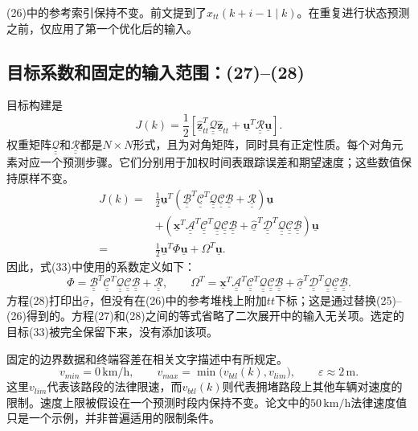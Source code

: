 \documentclass{article}
\newcommand{\uv}{\underline{\mathbf{u}}}
\newcommand{\xv}{\underline{\mathbf{x}}}
\newcommand{\zh}{\underline{\hat{\mathbf{z}}}_{tt}}
\newcommand{\sh}{\underline{\hat{\sigma}}}
\newcommand{\Am}{\underline{\underline{\mathcal A}}}
\newcommand{\Bm}{\underline{\underline{\mathcal B}}}
\newcommand{\Cm}{\underline{\underline{\mathcal C}}}
\newcommand{\Dm}{\underline{\underline{\mathcal D}}}
\newcommand{\Qm}{\underline{\underline{\mathcal Q}}}
\newcommand{\Rm}{\underline{\underline{\mathcal R}}}
\begin{document}
(26)中的参考索引保持不变。前文提到了\(x_{tt}(k+i-1\mid k)\)。在重复进行状态预测之前，仅应用了第一个优化后的输入。

\subsection*{目标系数和固定的输入范围：(27)--(28)}
目标构建是
\begin{equation}
J(k)=\frac12\left[\zh^T\Qm\zh+\uv^T\Rm\uv\right].
\tag{27}
\end{equation}
权重矩阵\(\Qm\)和\(\Rm\)都是\(N\times N\)形式，且为对角矩阵，同时具有正定性质。每个对角元素对应一个预测步骤。它们分别用于加权时间表跟踪误差和期望速度；这些数值保持原样不变。
\begin{equation}
\begin{aligned}
J(k)={}&\frac12\uv^T
\left(\Bm^T\Cm^T\Qm\Cm\Bm+\Rm\right)\uv\\
&+\left(\xv^T\Am^T\Cm^T\Qm\Cm\Bm
+\sh^T\Dm^T\Qm\Cm\Bm\right)\uv\\
={}&\frac12\uv^T\Phi\uv+\Omega^T\uv.
\end{aligned}
\tag{28}
\end{equation}
因此，式(33)中使用的系数定义如下：
\[
\Phi=\Bm^T\Cm^T\Qm\Cm\Bm+\Rm,
\qquad
\Omega^T=\xv^T\Am^T\Cm^T\Qm\Cm\Bm
+\sh^T\Dm^T\Qm\Cm\Bm.
\]
方程(28)打印出\(\sh\)，但没有在(26)中的参考堆栈上附加\(tt\)下标；这是通过替换(25)--(26)得到的。方程(27)和(28)之间的等式省略了二次展开中的输入无关项。选定的目标(33)被完全保留下来，没有添加该项。

固定的边界数据和终端容差在相关文字描述中有所规定。
\[
v_{min}=0\,\mathrm{km/h},\qquad
v_{max}=\min\bigl(v_{btl}(k),v_{lim}\bigr),\qquad
\varepsilon\approx 2\,\mathrm{m}.
\]
这里\(v_{lim}\)代表该路段的法律限速，而\(v_{btl}(k)\)则代表拥堵路段上其他车辆对速度的限制。速度上限被假设在一个预测时段内保持不变。论文中的\(50\,\mathrm{km/h}\)法律速度值只是一个示例，并非普遍适用的限制条件。
\end{document}
